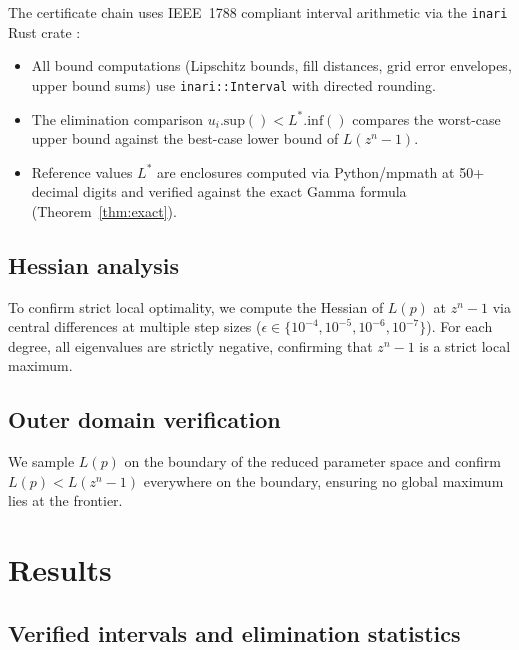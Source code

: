\documentclass[11pt]{article}
\theoremstyle{plain}
\theoremstyle{definition}
\theoremstyle{remark}
\begin{document}
The certificate chain uses IEEE~1788 compliant interval arithmetic via the \texttt{inari} Rust crate \cite{inari}:
\begin{itemize}[nosep]
\item All bound computations (Lipschitz bounds, fill distances, grid error envelopes, upper bound sums) use \texttt{inari::Interval} with directed rounding.
\item The elimination comparison $u_i.\mathrm{sup}() < L^*.\mathrm{inf}()$ compares the worst-case upper bound against the best-case lower bound of $L(z^n-1)$.
\item Reference values $L^*$ are enclosures computed via Python/mpmath at 50+ decimal digits and verified against the exact Gamma formula (Theorem~\ref{thm:exact}).
\end{itemize}

\subsection{Hessian analysis}

To confirm strict local optimality, we compute the Hessian of $L(p)$ at $z^n - 1$ via central differences at multiple step sizes ($\epsilon \in \{10^{-4}, 10^{-5}, 10^{-6}, 10^{-7}\}$). For each degree, all eigenvalues are strictly negative, confirming that $z^n - 1$ is a strict local maximum.

\subsection{Outer domain verification}

We sample $L(p)$ on the boundary of the reduced parameter space and confirm $L(p) < L(z^n - 1)$ everywhere on the boundary, ensuring no global maximum lies at the frontier.

\section{Results}
\label{sec:results}

\subsection{Verified intervals and elimination statistics}
\end{document}

